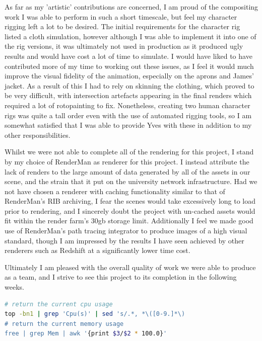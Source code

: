 \documentclass[11pt]{article}
\begin{document}
As far as my 'artistic' contributions are concerned, I am proud of the compositing work I was able to perform in such a short timescale, but feel my character rigging left a lot to be desired. The initial requirements for the character rig listed a cloth simulation, however although I was able to implement it into one of the rig versions, it was ultimately not used in production as it produced ugly results and would have cost a lot of time to simulate. I would have liked to have contributed more of my time to working out these issues, as I feel it would much improve the visual fidelity of the animation, especially on the aprons and James' jacket. As a result of this I had to rely on skinning the clothing, which proved to be very difficult, with intersection artefacts appearing in the final renders which required a lot of rotopainting to fix. Nonetheless, creating two human character rigs was quite a tall order even with the use of automated rigging tools, so I am somewhat satisfied that I was able to provide Yves with these in addition to my other responsibilities.

Whilst we were not able to complete all of the rendering for this project, I stand by my choice of RenderMan as renderer for this project. I instead attribute the lack of renders to the large amount of data generated by all of the assets in our scene, and the strain that it put on the university network infrastructure. Had we not have chosen a renderer with caching functionality similar to that of RenderMan's RIB archiving, I fear the scenes would take excessively long to load prior to rendering, and I sincerely doubt the project with un-cached assets would fit within the render farm's 30gb storage limit. Additionally I feel we made good use of RenderMan's path tracing integrator to produce images of a high visual standard, though I am impressed by the results I have seen achieved by other renderers such as Redshift at a significantly lower time cost.

Ultimately I am pleased with the overall quality of work we were able to produce as a team, and I strive to see this project to its completion in the following weeks.

\newpage




\newpage
\appendix

\begin{lstlisting}[language=bash, label={lst:cpumem}, caption={Extract from the Python script used to determine which of the computers on the university network are suitable for rendering on. By capturing the output of the following commands I was able to get the current CPU and memory usage.}]
# return the current cpu usage
top -bn1 | grep 'Cpu(s)' | sed 's/.*, *\([0-9.]*\)
# return the current memory usage
free | grep Mem | awk '{print $3/$2 * 100.0}'
\end{lstlisting}
\end{document}
